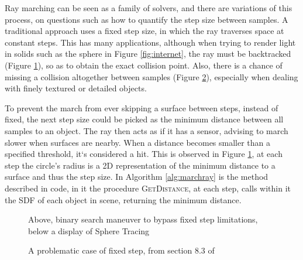 Ray marching can be seen as a family of solvers, and there are variations of this process, on questions such as how to quantify the step size between samples. A traditional approach uses a fixed step size, in which the ray traverses space at constant steps. This has many applications, although when trying to render light in solids such as the sphere in Figure \ref{fig:internet}, the ray must be backtracked (Figure \ref{fig:spheretracing}), so as to obtain the exact collision point. Also, there is a chance of missing a collision altogether between samples (Figure \ref{fig:raymarch_fail}), especially when dealing with finely textured or detailed objects.

To prevent the march from ever skipping a surface between steps, instead of fixed, the next step size could be picked as the minimum distance between all samples to an object. The ray then acts as if it has a sensor, advising to march slower when surfaces are nearby. When a distance becomes smaller than a specified threshold, it`s considered a hit. This is observed in Figure \ref{fig:spheretracing}, at each step the circle's radius is a 2D representation of the minimum distance to a surface and thus the step size. In Algorithm \ref{alg:marchray} is the method described in code, in it the procedure \textsc{GetDistance}, at each step, calls within it the SDF of each object in scene, returning the minimum distance.

\begin{figure}[ht]
    \centering
    \caption{Above, binary search maneuver to bypass fixed step limitations, below a display of Sphere Tracing}
    \label{fig:spheretracing}
\end{figure}

\begin{figure}[ht]
    \centering
    \caption{A problematic case of fixed step, from section 8.3 of \cite{book:REF_BOOK_1}}
    \label{fig:raymarch_fail}
\end{figure}

